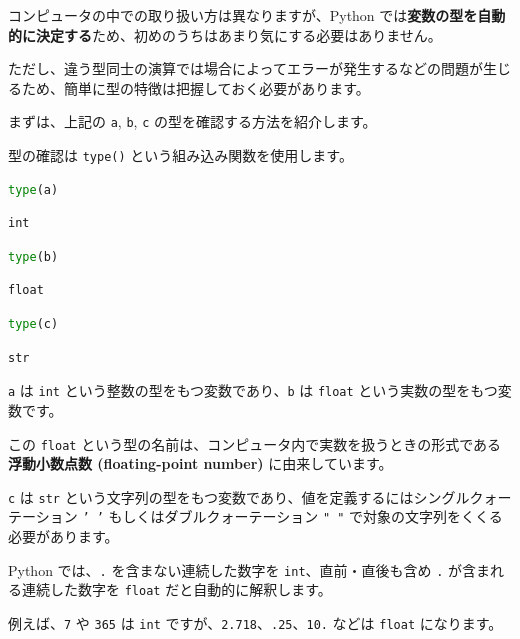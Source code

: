 コンピュータの中での取り扱い方は異なりますが、Python では\textbf{変数の型を自動的に決定する}ため、初めのうちはあまり気にする必要はありません。

ただし、違う型同士の演算では場合によってエラーが発生するなどの問題が生じるため、簡単に型の特徴は把握しておく必要があります。


まずは、上記の \texttt{a}, \texttt{b}, \texttt{c} の型を確認する方法を紹介します。

型の確認は \texttt{type()} という組み込み関数を使用します。


\begin{lstlisting}[style=codecell,language=Python]
type(a)
\end{lstlisting}

\begin{lstlisting}[style=outputcell]
int
\end{lstlisting}

\begin{lstlisting}[style=codecell,language=Python]
type(b)
\end{lstlisting}

\begin{lstlisting}[style=outputcell]
float
\end{lstlisting}

\begin{lstlisting}[style=codecell,language=Python]
type(c)
\end{lstlisting}

\begin{lstlisting}[style=outputcell]
str
\end{lstlisting}

\texttt{a} は \texttt{int} という整数の型をもつ変数であり、\texttt{b} は \texttt{float} という実数の型をもつ変数です。

この \texttt{float} という型の名前は、コンピュータ内で実数を扱うときの形式である\textbf{浮動小数点数 (floating-point number)} に由来しています。


\texttt{c} は \texttt{str} という文字列の型をもつ変数であり、値を定義するにはシングルクォーテーション \texttt{' '} もしくはダブルクォーテーション \texttt{" "} で対象の文字列をくくる必要があります。


Python では、\texttt{.} を含まない連続した数字を \texttt{int}、直前・直後も含め \texttt{.} が含まれる連続した数字を \texttt{float} だと自動的に解釈します。

例えば、\texttt{7} や \texttt{365} は \texttt{int} ですが、\texttt{2.718}、\texttt{.25}、\texttt{10.} などは \texttt{float} になります。


